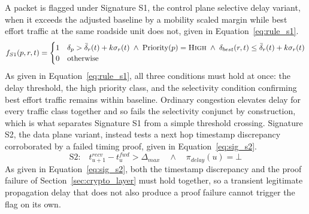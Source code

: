 \documentclass[final,5p,twocolumn]{elsarticle}
\theoremstyle{remark}
\theoremstyle{plain}
\begin{document}
A packet is flagged under Signature S1, the control plane selective delay
variant, when it exceeds the adjusted baseline by a mobility scaled margin
while best effort traffic at the same roadside unit does not, given in
Equation~\eqref{eq:rule_s1}.
\begin{equation}
	f_{S1}(p,r,t) =
	\begin{cases}
		1 & \delta_p > \bar{\delta}_r(t) + k\sigma_r(t) \;\land\; \text{Priority}(p) = \textsc{High} \;\land\; \delta_{best}(r,t) \leq \bar{\delta}_r(t) + k\sigma_r(t) \\
		0 & \text{otherwise}
	\end{cases}
	\label{eq:rule_s1}
\end{equation}
As given in Equation~\eqref{eq:rule_s1}, all three conditions must hold at
once: the delay threshold, the high priority class, and the selectivity
condition confirming best effort traffic remains within baseline. Ordinary
congestion elevates delay for every traffic class together and so fails the
selectivity conjunct by construction, which is what separates Signature S1
from a simple threshold crossing. Signature S2, the data plane variant,
instead tests a next hop timestamp discrepancy corroborated by a failed
timing proof, given in Equation~\eqref{eq:sig_s2}.
\begin{equation}
	\text{S2:}\quad t^{recv}_{u+1} - t^{fwd}_{u} > \Delta_{max} \quad \land \quad \pi_{delay}(u) = \bot
	\label{eq:sig_s2}
\end{equation}
As given in Equation~\eqref{eq:sig_s2}, both the timestamp discrepancy and
the proof failure of Section~\ref{sec:crypto_layer} must hold together, so a
transient legitimate propagation delay that does not also produce a proof
failure cannot trigger the flag on its own.
\end{document}
